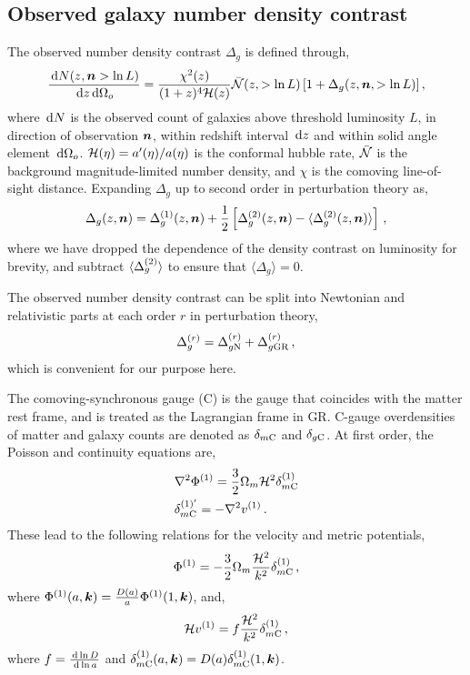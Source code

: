 \subsection{Observed galaxy number density contrast}

The observed number density contrast $\Delta_g$ is defined through, 
\begin{equation}
	\frac{\,\mathrm{d} N(z, \bm {n} > \ln L)}{\,\mathrm{d} z \,\mathrm{d} \Omega_o} = \frac{\chi^2(z)}{(1 + z)^4 \mathcal{H}(z)} \bar{\mathcal{N}}(z, > \ln L) \left[ 1 + \Delta_g(z, \bm {n}, >\ln L) \right],
\end{equation}
where $\,\mathrm{d} N$ is the observed count of galaxies above threshold luminosity $L$, in direction of observation $\bm {n}$, within redshift interval $\,\mathrm{d} z$ and within solid angle element $\,\mathrm{d} \Omega_o$. $\mathcal{H}(\eta) = a'(\eta)/a(\eta)$ is the conformal hubble rate, $\bar{\mathcal{N}}$ is the background magnitude-limited number density, and $\chi$ is the comoving line-of-sight distance. Expanding $\Delta_g$ up to second order in perturbation theory as, 
\begin{equation}
	\Delta_g(z,\bm {n}) = \Delta_g^{(1)}(z, \bm {n}) + \frac{1}{2} \left[ \Delta_g^{(2)}(z,\bm {n}) - \langle \Delta_g^{(2)}(z,\bm {n})\rangle \right]\,,
\end{equation}
where we have dropped the dependence of the density contrast on luminosity for brevity, and subtract $\langle \Delta_g^{(2)} \rangle$ to ensure that $\langle \Delta_g \rangle = 0$. 

The observed number density contrast can be split into Newtonian and relativistic parts at each order $r$ in perturbation theory,
\begin{equation}
	\Delta_g^{(r)} = \Delta_{g \mathrm{N}}^{(r)} + \Delta_{g \mathrm{GR}}^{(r)}\,,
\end{equation}
which is convenient for our purpose here.

The comoving-synchronous gauge (C) is the gauge that coincides with the matter rest frame, and is treated as the Lagrangian frame in GR. C-gauge overdensities of matter and galaxy counts are denoted as $\delta_{m\mathrm{C}}$ and $\delta_{g\mathrm{C}}$. At first order, the Poisson and continuity equations are,
\begin{align}
	&\nabla^2 \Phi^{(1)} = \frac{3}{2} \Omega_m \mathcal{H}^2 \delta_{m\mathrm{C}}^{(1)} \\
	&\delta_{m\mathrm{C}}^{{(1)}'} = - \nabla^2 v^{(1)}\,.
\end{align}
These lead to the following relations for the velocity and metric potentials,
\begin{equation}
	\Phi^{(1)} = - \frac{3}{2} \Omega_m \frac{\mathcal{H}^2}{k^2} \delta_{m\mathrm{C}}^{(1)}\,,
\end{equation}
where $\Phi^{(1)}(a,\bm {k}) = \frac{D(a)}{a} \Phi^{(1)}(1,\bm {k})$, and,
\begin{equation}\label{eq:scdepvel}
	\mathcal{H} v^{(1)} = f \frac{\mathcal{H}^2}{k^2} \delta^{(1)}_{m\mathrm{C}}\,,
\end{equation}
where $f = \frac{\,\mathrm{d} \ln D}{\,\mathrm{d} \ln a}$ and $\delta^{(1)}_{m\mathrm{C}}(a,\bm {k}) = D(a) \delta^{(1)}_{m\mathrm{C}}(1,\bm {k})$. 

